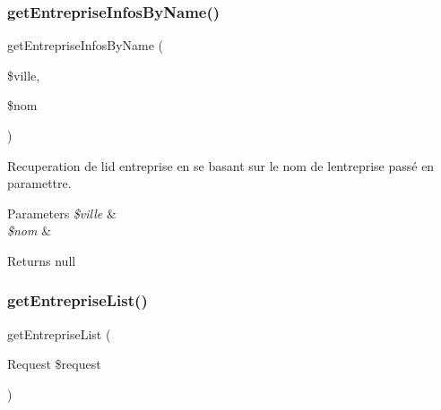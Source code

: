 \subsubsection{\texorpdfstring{get\+Entreprise\+Infos\+By\+Name()}{getEntrepriseInfosByName()}}
{\footnotesize\ttfamily get\+Entreprise\+Infos\+By\+Name (\begin{DoxyParamCaption}\item[{}]{\$ville,  }\item[{}]{\$nom }\end{DoxyParamCaption})}

Recuperation de l\textquotesingle{}id entreprise en se basant sur le nom de l\textquotesingle{}entreprise passé en paramettre. 
\begin{DoxyParams}{Parameters}
{\em \$ville} & \\
\hline
{\em \$nom} & \\
\hline
\end{DoxyParams}
\begin{DoxyReturn}{Returns}
null 
\end{DoxyReturn}
\mbox{\label{class_app_1_1_http_1_1_controllers_1_1_entreprise_informations_controller_a2bf9b1b8a729682c9ba6b36f164cde93}} 
\subsubsection{\texorpdfstring{get\+Entreprise\+List()}{getEntrepriseList()}}
{\footnotesize\ttfamily get\+Entreprise\+List (\begin{DoxyParamCaption}\item[{Request}]{\$request }\end{DoxyParamCaption})}


